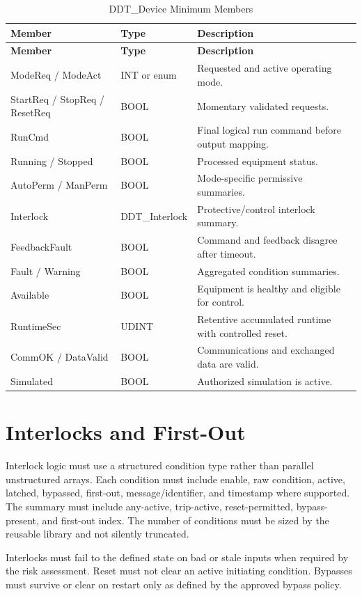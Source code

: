\begin{longtable}{@{}P{3.97cm}P{3.61cm}P{8.06cm}@{}}
\caption{DDT\_Device Minimum Members}\label{tab:ddt-device}\\
\toprule {}\textbf{Member} & \textbf{Type} & \textbf{Description}\\ \midrule
\endfirsthead
\toprule {}\textbf{Member} & \textbf{Type} & \textbf{Description}\\ \midrule
\endhead
ModeReq / ModeAct & INT or enum & Requested and active operating mode.\\
StartReq / StopReq / ResetReq & BOOL & Momentary validated requests.\\
RunCmd & BOOL & Final logical run command before output mapping.\\
Running / Stopped & BOOL & Processed equipment status.\\
AutoPerm / ManPerm & BOOL & Mode-specific permissive summaries.\\
Interlock & DDT\_Interlock & Protective/control interlock summary.\\
FeedbackFault & BOOL & Command and feedback disagree after timeout.\\
Fault / Warning & BOOL & Aggregated condition summaries.\\
Available & BOOL & Equipment is healthy and eligible for control.\\
RuntimeSec & UDINT & Retentive accumulated runtime with controlled reset.\\
CommOK / DataValid & BOOL & Communications and exchanged data are valid.\\
Simulated & BOOL & Authorized simulation is active.\\
\bottomrule
\end{longtable}

\section{Interlocks and First-Out}
Interlock logic must use a structured condition type rather than parallel unstructured arrays. Each condition must include enable, raw condition, active, latched, bypassed, first-out, message/identifier, and timestamp where supported. The summary must include any-active, trip-active, reset-permitted, bypass-present, and first-out index. The number of conditions must be sized by the reusable library and not silently truncated.

Interlocks must fail to the defined state on bad or stale inputs when required by the risk assessment. Reset must not clear an active initiating condition. Bypasses must survive or clear on restart only as defined by the approved bypass policy.

